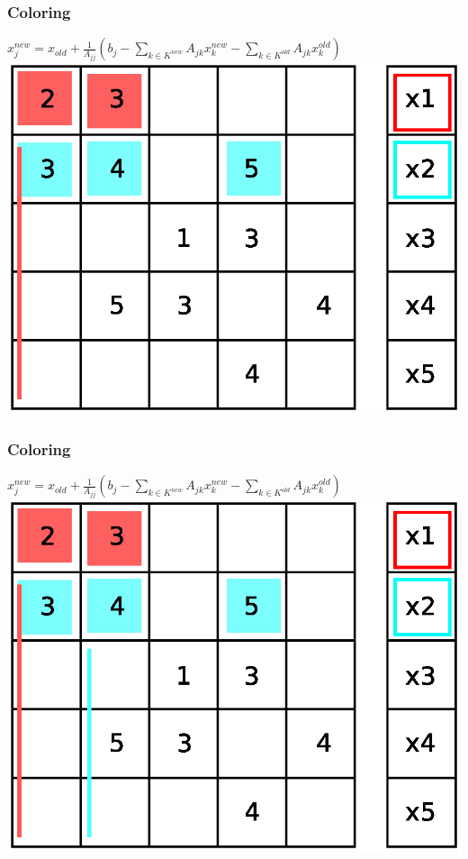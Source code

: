 \documentclass{beamer}
\begin{document}
\begin{frame}
\frametitle{Coloring}
$ x_j^{new} = x_{old} + \frac{1}{A_{jj}} \left(b_{j} - \sum_{k \in K^{new}}A_{jk}
 x_k^{new} - \sum_{k \in K^{old}}A_{jk} x_k^{old}\right)$
\includegraphics[width=0.8\linewidth]{graphic/coloringGS6.eps}
\end{frame}

\begin{frame}
\frametitle{Coloring}
$ x_j^{new} = x_{old} + \frac{1}{A_{jj}} \left(b_{j} - \sum_{k \in K^{new}}A_{jk}
 x_k^{new} - \sum_{k \in K^{old}}A_{jk} x_k^{old}\right)$
\includegraphics[width=0.8\linewidth]{graphic/coloringGS7.eps}
\end{frame}
\end{document}
